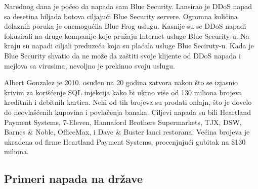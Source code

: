 \documentclass[a4paper]{article}
\theoremstyle{break}
\begin{document}
{\begin{description}
Narednog dana je počeo da napada sam Blue Security. Lansirao je DDoS napad sa desetina hiljada botova ciljajući Blue Security servere. Ogromna količina dolaznih poruka je onemogućila Blue Frog uslugu. Kasnije su se DDoS napadi fokusirali na druge kompanije koje pružaju Internet usluge Blue Security-u. Na kraju su napadi ciljali preduzeća koja su plaćala usluge Blue Seciruty-u. Kada je Blue Security shvatio da ne može da zaštiti svoje klijente od DDoS napada i mejlova sa virusima, nevoljno je prekinuo svoju uslugu.



\item[ALBERT GONZALEZ] Albert Gonzalez je 2010. osuđen na 20 godina zatvora nakon što se izjasnio krivim za korišćenje SQL injekcija kako bi ukrao više od 130 miliona brojeva kreditnih i debitnih kartica. Neki od tih brojeva su prodati onlajn, što je dovelo do neovlašćenih kupovina i povlačenja banaka. Ciljevi napada su bili Heartland Payment Systems,  7-Eleven,  Hannaford Brothers Supermarkets,  TJX,  DSW,  Barnes \& Noble, OfficeMax, i Dave \& Buster lanci restorana. Većina brojeva je ukradena od firme Heartland Payment Systems, procenjujući gubitak na \$130 miliona.
\end{description}

\subsection{Primeri napada na države}
\label{subsec:primeri_napada_drzave}

}
\end{document}
